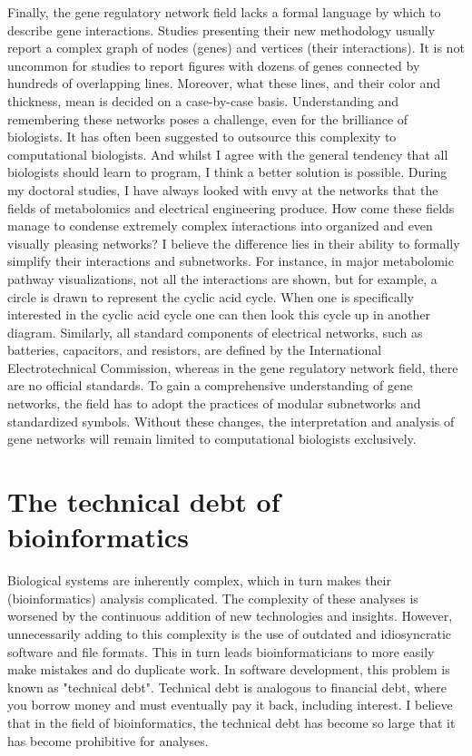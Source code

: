 Finally, the gene regulatory network field lacks a formal language by which to describe gene interactions\cite{Lazebnik2002}. Studies presenting their new methodology usually report a complex graph of nodes (genes) and vertices (their interactions)\cite{Xu_2020,Aibar_2017,Margolin_2006,Glass_2013,Chan_2017,Jiang_2021,Kamimoto_2020,Woodhouse_2018,Rubiolo_2017}. It is not uncommon for studies to report figures with dozens of genes connected by hundreds of overlapping lines. Moreover, what these lines, and their color and thickness, mean is decided on a case-by-case basis. Understanding and remembering these networks poses a challenge, even for the brilliance of biologists. It has often been suggested to outsource this complexity to computational biologists\cite{Lazebnik2002,Bray2001,Markowetz2017}. And whilst I agree with the general tendency that all biologists should learn to program, I think a better solution is possible. During my doctoral studies, I have always looked with envy at the networks that the fields of metabolomics and electrical engineering produce. How come these fields manage to condense extremely complex interactions into organized and even visually pleasing networks? I believe the difference lies in their ability to formally simplify their interactions and subnetworks. For instance, in major metabolomic pathway visualizations, not all the interactions are shown, but for example, a circle is drawn to represent the cyclic acid cycle. When one is specifically interested in the cyclic acid cycle one can then look this cycle up in another diagram. Similarly, all standard components of electrical networks, such as batteries, capacitors, and resistors, are defined by the International Electrotechnical Commission\cite{IEC}, whereas in the gene regulatory network field, there are no official standards. To gain a comprehensive understanding of gene networks, the field has to adopt the practices of modular subnetworks and standardized symbols. Without these changes, the interpretation and analysis of gene networks will remain limited to computational biologists exclusively.

\section{The technical debt of bioinformatics}

Biological systems are inherently complex, which in turn makes their (bioinformatics) analysis complicated. The complexity of these analyses is worsened by the continuous addition of new technologies and insights. However, unnecessarily adding to this complexity is the use of outdated and idiosyncratic software and file formats. This in turn leads bioinformaticians to more easily make mistakes and do duplicate work. In software development, this problem is known as "technical debt". Technical debt is analogous to financial debt, where you borrow money and must eventually pay it back, including interest. I believe that in the field of bioinformatics, the technical debt has become so large that it has become prohibitive for analyses.

